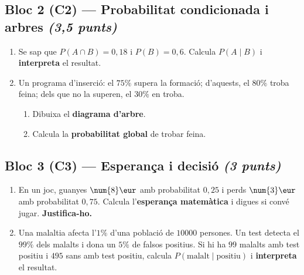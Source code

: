 \subsection*{Bloc 2 (C2) — Probabilitat condicionada i arbres \hfill \normalfont\itshape (3,5 punts)}

\begin{enumerate}[label=\textbf{\arabic*.}, leftmargin=2em, itemsep=8pt, start=3]
  \item Se sap que $P(A\cap B)=0,18$ i $P(B)=0,6$. Calcula $P(A\mid B)$ i
        \textbf{interpreta} el resultat.
  \item Un programa d'inserció: el $75\%$ supera la formació; d'aquests, el $80\%$ troba
        feina; dels que no la superen, el $30\%$ en troba.
    \begin{enumerate}[label=\alph*), leftmargin=1.6em, topsep=2pt]
      \item Dibuixa el \textbf{diagrama d'arbre}.
      \item Calcula la \textbf{probabilitat global} de trobar feina.
    \end{enumerate}
\end{enumerate}

\subsection*{Bloc 3 (C3) — Esperança i decisió \hfill \normalfont\itshape (3 punts)}

\begin{enumerate}[label=\textbf{\arabic*.}, leftmargin=2em, itemsep=8pt, start=5]
  \item En un joc, guanyes $\num{8}\eur$ amb probabilitat $0,25$ i perds $\num{3}\eur$
        amb probabilitat $0,75$. Calcula l'\textbf{esperança matemàtica} i digues si
        convé jugar. \textbf{Justifica-ho.}
  \item Una malaltia afecta l'$1\%$ d'una població de $\num{10000}$ persones. Un test
        detecta el $99\%$ dels malalts i dona un $5\%$ de falsos positius. Si hi ha $99$
        malalts amb test positiu i $495$ sans amb test positiu, calcula
        $P(\text{malalt}\mid\text{positiu})$ i \textbf{interpreta} el resultat.
\end{enumerate}

